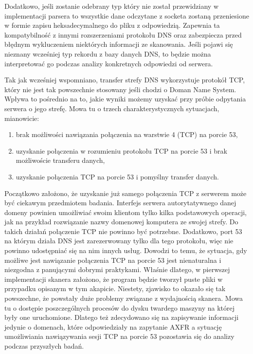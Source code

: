 Dodatkowo, jeśli zostanie odebrany typ który nie został przewidziany w implementacji parsera to wszystkie dane odczytane z socketa zostaną przeniesione w formie zapisu heksadecymalnego do pliku z odpowiedzią. Zapewnia ta kompatybilność z innymi rozszerzeniami protokołu DNS oraz zabezpiecza przed błędnym wykluczeniem niektórych informacji ze skanowania. Jeśli pojawi się nieznany wcześniej typ rekordu z bazy danych DNS, to będzie można interpretować go podczas analizy konkretnych odpowiedzi od serwera.

Tak jak wcześniej wspomniano, transfer strefy DNS wykorzystuje protokół TCP, który nie jest tak powszechnie stosowany jeśli chodzi o Doman Name System. Wpływa to pośrednio na to, jakie wyniki możemy uzyskać przy próbie odpytania serwera o jego strefę. Mowa tu o trzech charakterystycznych sytuacjach, mianowicie:
\begin{enumerate}
	\item brak możliwości nawiązania połączenia na warstwie 4 (TCP) na porcie 53,
	\item uzyskanie połączenia w rozumieniu protokołu TCP na porcie 53 i brak możliwoście transferu danych,
	\item uzyskanie połączenia TCP na porcie 53 i pomyślny transfer danych.
\end{enumerate}

Początkowo założono, że uzyskanie już samego połączenia TCP z serwerem może być ciekawym przedmiotem badania. Interfejs serwera autorytatywnego danej domeny powinien umożliwiać swoim klientom tylko kilka podstawowych operacji, jak na przykład rozwiązanie nazwy domenowej komputera ze swojej strefy. Do takich działań połączenie TCP nie powinno być potrzebne. Dodatkowo, port 53 na którym działa DNS jest zarezerwowany tylko dla tego protokołu, więc nie powinno udostępniać się na nim innych usług. Dowodzi to temu, że sytuacja, gdy możliwe jest nawiązanie połączenia TCP na porcie 53 jest nienaturalna i niezgodna z panującymi dobrymi praktykami. Właśnie dlatego, w pierwszej implementacji skanera założono, że program będzie tworzył puste pliki w przypadku opisanym w tym akapicie. Niestety, zjawisko to okazało się tak powszechne, że powstały duże problemy związane z wydajnością skanera. Mowa tu o dostępie poszczególnych procesów do dysku twardego maszyny na której były one uruchomione. Dlatego też zdecydowano się na zapisywanie informacji jedynie o domenach, które odpowiedziały na zapytanie AXFR a sytuację umożliwiania nawiązywania sesji TCP na porcie 53 pozostawia się do analizy podczas przyszłych badań.

